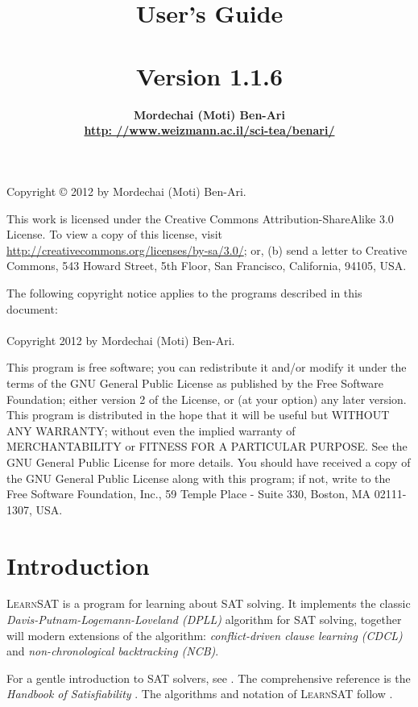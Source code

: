 \documentclass[11pt]{article}
\author{\bfseries Mordechai (Moti) Ben-Ari\\\url{http: //www.weizmann.ac.il/sci-tea/benari/}}
\title{\bfseries \ls\\\mbox{}\\
\bfseries\large User's Guide\\\mbox{}\\
\bfseries\normalsize Version 1.1.6}
\newcommand*{\ls}{\textsc{LearnSAT}}
\begin{document}
\maketitle
\thispagestyle{empty}

\vfill

\begin{center}
Copyright \copyright{} 2012 by Mordechai (Moti) Ben-Ari.
\end{center}
This work is licensed under the Creative Commons Attribution-ShareAlike 3.0
License. To view a copy of this license, visit
\url{http://creativecommons.org/licenses/by-sa/3.0/}; or, (b) send a letter
to Creative Commons, 543 Howard Street, 5th Floor, San Francisco,
California, 94105, USA.

\bigskip

 
\begin{center}
The following copyright notice applies to the programs described in this
document:\mbox{}\\\mbox{}\\
Copyright 2012 by Mordechai (Moti) Ben-Ari.
\end{center}

This program is free software; you can redistribute it and/or
modify it under the terms of the GNU General Public License
as published by the Free Software Foundation; either version 2
of the License, or (at your option) any later version.
This program is distributed in the hope that it will be useful
but WITHOUT ANY WARRANTY; without even the implied warranty of
MERCHANTABILITY or FITNESS FOR A PARTICULAR PURPOSE.
See the GNU General Public License for more details.
You should have received a copy of the GNU General Public License
along with this program; if not, write to the Free Software
Foundation, Inc., 59 Temple Place - Suite 330, Boston, MA
02111-1307, USA.

\newpage

\section{Introduction}

\ls{} is a program for learning about SAT solving. It implements the
classic \emph{Davis-Putnam-Logemann-Loveland (DPLL)} algorithm for SAT
solving, together will modern extensions of the algorithm:
\emph{conflict-driven clause learning (CDCL)} and
\emph{non-chronological backtracking (NCB)}.

For a gentle introduction to SAT solvers, see \cite[Chapter~6]{mlcs}.
The comprehensive reference is the \emph{Handbook of Satisfiability}
\cite{SAT}. The algorithms and notation of \ls{} follow \cite{mlm}.
\end{document}
